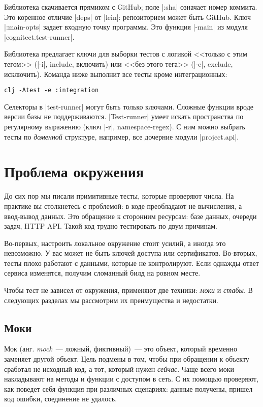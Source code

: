 Библиотека скачивается прямиком с GitHub; поле \spverb|:sha| означает номер
коммита. Это коренное отличие \spverb|deps| от \spverb|lein|: репозиторием может
быть GitHub. Ключ \spverb|:main-opts| задает входную точку программы. Это
функция \spverb|-main| из модуля \spverb|cognitect.test-runner|.

Библиотека предлагает ключи для выборки тестов с логикой <<только с этим тегом>>
(\spverb|-i|, include, включить) или <<без этого тега>> (\spverb|-e|, exclude,
исключить). Команда ниже выполнит все тесты кроме интеграционных:

\begin{verbatim}
clj -Atest -e :integration
\end{verbatim}

Селекторы в \spverb|test-runner| могут быть только ключами. Сложные функции
вроде версии базы не поддерживаются. \spverb|Test-runner| умеет искать
пространства по регулярному выражению (ключ \spverb|-r|, namespace-regex). С ним
можно выбрать тесты по \emph{доменной} структуре, например, все дочерние модули
\spverb|project.api|.

\section{Проблема окружения}

До сих пор мы писали примитивные тесты, которые проверяют числа. На практике вы
столкнетесь с проблемой: в коде преобладают не вычисления, а ввод-вывод
данных. Это обращение к сторонним ресурсам: базе данных, очереди задач, HTTP
API. Такой код трудно тестировать по двум причинам.

Во-первых, настроить локальное окружение стоит усилий, а иногда это
невозможно. У вас может не быть ключей доступа или сертификатов. Во-вторых,
тесты плохо работают с данными, которые не контролируют. Если однажды ответ
сервиса изменятся, получим сломанный билд на ровном месте.

Чтобы тест не зависел от окружения, применяют две техники: \emph{моки} и
\emph{стабы}. В следующих разделах мы рассмотрим их преимущества и недостатки.

\subsection{Моки}

Мок (анг. \emph{mock}~--- ложный, фиктивный)~--- это объект, который временно
заменяет другой объект. Цель подмены в том, чтобы при обращении к объекту
сработал не исходный код, а тот, который нужен \emph{сейчас}. Чаще всего моки
накладывают на методы и функции с доступом в сеть. С их помощью проверяют, как
поведет себя функция при различных сценариях: данные получены, пришел код
ошибки, соединение не удалось.

